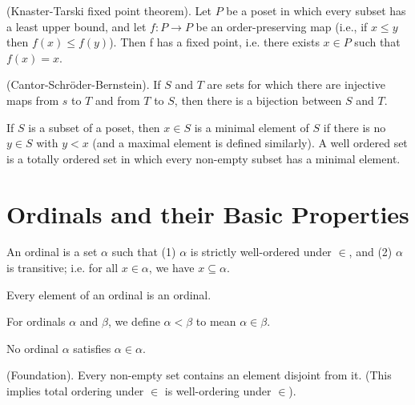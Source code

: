 \documentclass{report}
\begin{document}
\begin{theorem}
  {\normalfont (Knaster-Tarski fixed point theorem).} Let $P$ be a poset in which every subset has a least upper bound, and let $f:P \rightarrow P$ be an order-preserving map (i.e., if $x \leq y$ then $f(x) \leq f(y)$). Then f has a fixed point, i.e. there exists $x \in P$ such that $f(x) = x$.
\end{theorem}

\begin{theorem}
  {\normalfont (Cantor-Schr{\"o}der-Bernstein).} If $S$ and $T$ are sets for which there are injective maps from $s$ to $T$ and from $T$ to $S$, then there is a bijection between $S$ and $T$.
\end{theorem}

\begin{definition}
  If $S$ is a subset of a poset, then $x \in S$ is a minimal element of $S$ if there is no $y \in S$ with $y < x$ (and a maximal element is defined similarly). A well ordered set is a totally ordered set in which every non-empty subset has a minimal element.
\end{definition}

\newpage
\section{Ordinals and their Basic Properties}
\begin{definition}
  An ordinal is a set $\alpha$ such that (1) $\alpha$ is strictly well-ordered under $\in$, and (2) $\alpha$ is transitive; i.e. for all $x \in \alpha$, we have $x \subseteq \alpha$.
\end{definition}

\begin{proposition}
  Every element of an ordinal is an ordinal.
\end{proposition}

\begin{definition}
  For ordinals $\alpha$ and $\beta$, we define $\alpha < \beta$ to mean $\alpha \in \beta$.
\end{definition}

\begin{lemma}
  No ordinal $\alpha$ satisfies $\alpha \in \alpha$.
\end{lemma}

\begin{axiom}
  {\normalfont (Foundation).} Every non-empty set contains an element disjoint from it. (This implies total ordering under $\in$ is well-ordering under $\in$). 
\end{axiom}
\end{document}
